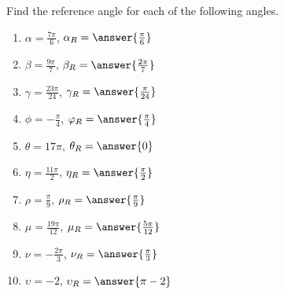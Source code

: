 \documentclass{ximera}
\author{Kenneth Berglund}
\begin{document}
\begin{exercise}
Find the reference angle for each of the following angles. 

\begin{enumerate}
\item $\alpha = \frac{7\pi}{6}$, $\alpha_R=\answer{\frac{\pi}{6}}$
\item $\beta = \frac{9\pi}{7}$, $\beta_R=\answer{\frac{2\pi}{7}}$
\item $\gamma = \frac{23\pi}{24}$, $\gamma_R=\answer{\frac{\pi}{24}}$
\item $\phi = -\frac{\pi}{4}$, $\phi_R=\answer{\frac{\pi}{4}}$
\item $\theta = 17\pi$, $\theta_R=\answer{0}$
\item $\eta = \frac{11\pi}{2}$, $\eta_R=\answer{\frac{\pi}{2}}$
\item $\rho = \frac{\pi}{9}$, $\rho_R=\answer{\frac{\pi}{9}}$
\item $\mu = \frac{19\pi}{12}$, $\mu_R=\answer{\frac{5\pi}{12}}$
\item $\nu = -\frac{2\pi}{3}$, $\nu_R=\answer{\frac{\pi}{3}}$
\item $\upsilon = -2$, $\upsilon_R=\answer{\pi - 2}$
\end{enumerate}

\end{exercise}
\end{document}
